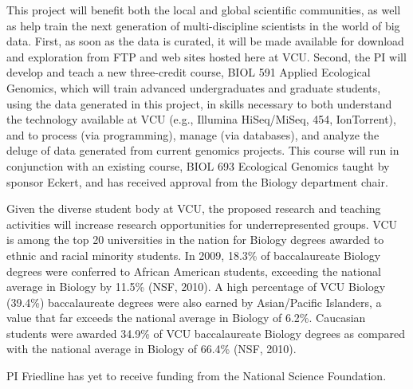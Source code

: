 This project will benefit both the local and global scientific communities, as well as help train 
the next generation of multi-discipline scientists in the world of big data.  First, as soon as the data is curated, it will be made 
available for download and exploration from FTP and web sites hosted here at VCU.  Second, the PI will develop and teach a new 
three-credit course, BIOL 591 Applied Ecological Genomics, which will train advanced undergraduates and 
graduate students, using the data generated in this project, in skills necessary to both understand the 
technology available at VCU (e.g., Illumina HiSeq/MiSeq, 454, IonTorrent), and to 
process (via programming), manage (via databases), and analyze the deluge of data generated from current genomics 
projects.  This course will run in conjunction with an existing course, BIOL 693 Ecological Genomics taught by sponsor Eckert, 
and has received approval from the Biology department chair.

Given the diverse student body at VCU, the proposed research and 
teaching activities will increase research opportunities for underrepresented groups. VCU is among the top 20 universities in the 
nation for Biology degrees awarded to ethnic and racial minority students. In 2009, 18.3\% of baccalaureate Biology degrees were 
conferred to African American students, exceeding the national average in Biology by 11.5\% (NSF, 2010). A high percentage of 
VCU Biology (39.4\%) baccalaureate degrees were also earned by Asian/Pacific Islanders, a value that far exceeds the 
national average in Biology of 6.2\%. Caucasian students were awarded 34.9\% of VCU baccalaureate Biology degrees as 
compared with the national average in Biology of 66.4\% (NSF, 2010).




PI Friedline has yet to receive funding from the National Science Foundation.